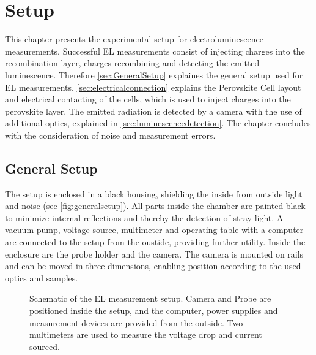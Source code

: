 \chapter{Setup}
This chapter presents the experimental setup for electroluminescence measurements. Successful EL measurements consist of injecting charges into the recombination layer, charges recombining and detecting the emitted luminescence. Therefore \autoref{sec:GeneralSetup} explaines the general setup used for EL measurements. \autoref{sec:electricalconnection} explains the Perovskite Cell layout and electrical contacting of the cells, which is used to inject charges into the perovskite layer. The emitted radiation is detected by a camera with the use of additional optics,  explained in \autoref{sec:luminescencedetection}. The chapter concludes with the consideration of noise and measurement errors.

\section{General Setup}\label{sec:GeneralSetup}
The setup is enclosed in a black housing, shielding the inside from outside light and noise (see \autoref{fig:generalsetup}). All parts inside the chamber are painted black to minimize internal reflections and thereby the detection of stray light. A vacuum pump, voltage source, multimeter and operating table with a computer are connected to the setup from the oustide, providing further utility. Inside the enclosure are the probe holder and the camera. The camera is mounted on rails and can be moved in three dimensions, enabling position according to the used optics and samples.
\begin{figure}[h]
	\centering
	
	\caption{Schematic of the EL measurement setup. Camera and Probe are positioned inside the setup, and the computer, power supplies and measurement devices are provided from the outside. Two multimeters are used to measure the voltage drop and current sourced.}
	\label{fig:generalsetup}
\end{figure}
\FloatBarrier
